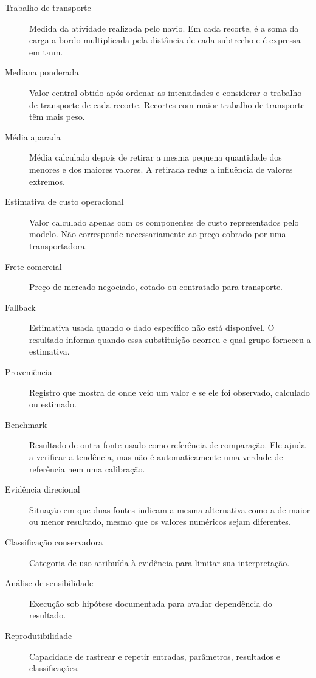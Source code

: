 \documentclass[12pt,a4paper,oneside]{report}
\begin{document}
\begin{description}
  \item[Trabalho de transporte] Medida da atividade realizada pelo navio. Em cada recorte, é a soma da carga a bordo multiplicada pela distância de cada subtrecho e é expressa em t$\cdot$nm.
  \item[Mediana ponderada] Valor central obtido após ordenar as intensidades e considerar o trabalho de transporte de cada recorte. Recortes com maior trabalho de transporte têm mais peso.
  \item[Média aparada] Média calculada depois de retirar a mesma pequena quantidade dos menores e dos maiores valores. A retirada reduz a influência de valores extremos.
  \item[Estimativa de custo operacional] Valor calculado apenas com os componentes de custo representados pelo modelo. Não corresponde necessariamente ao preço cobrado por uma transportadora.
  \item[Frete comercial] Preço de mercado negociado, cotado ou contratado para transporte.
  \item[Fallback] Estimativa usada quando o dado específico não está disponível. O resultado informa quando essa substituição ocorreu e qual grupo forneceu a estimativa.
  \item[Proveniência] Registro que mostra de onde veio um valor e se ele foi observado, calculado ou estimado.
  \item[Benchmark] Resultado de outra fonte usado como referência de comparação. Ele ajuda a verificar a tendência, mas não é automaticamente uma verdade de referência nem uma calibração.
  \item[Evidência direcional] Situação em que duas fontes indicam a mesma alternativa como a de maior ou menor resultado, mesmo que os valores numéricos sejam diferentes.
  \item[Classificação conservadora] Categoria de uso atribuída à evidência para limitar sua interpretação.
  \item[Análise de sensibilidade] Execução sob hipótese documentada para avaliar dependência do resultado.
  \item[Reprodutibilidade] Capacidade de rastrear e repetir entradas, parâmetros, resultados e classificações.
\end{description}
\normalsize

\clearpage
{}
\tableofcontents
\clearpage
{}
\listoffigures
\clearpage
{}
\listoftables
\end{document}
